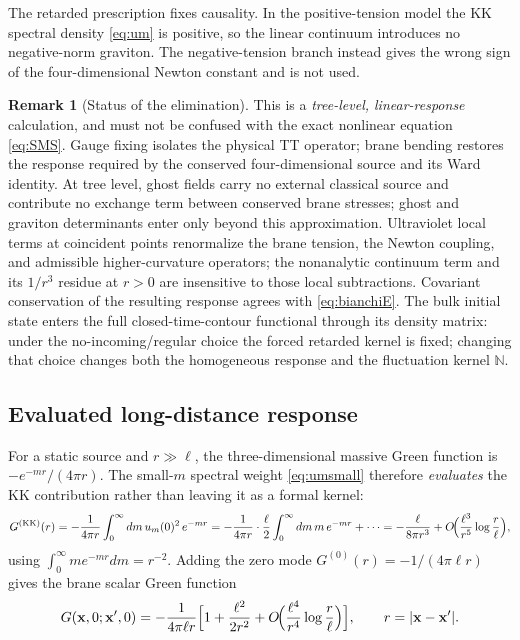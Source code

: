 \documentclass[11pt,a4paper]{article}
\theoremstyle{plain}
\theoremstyle{definition}
\newtheorem{remark}[theorem]{Remark}
\newcommand{\KK}{\mathrm{KK}}
\begin{document}
The retarded prescription fixes causality. In the positive-tension model
the KK spectral density \eqref{eq:um} is positive, so the linear
continuum introduces no negative-norm graviton. The negative-tension
branch instead gives the wrong sign of the four-dimensional Newton
constant and is not used.

\begin{remark}[Status of the elimination]
\label{rem:treelevel}
This is a \emph{tree-level, linear-response} calculation, and must not be
confused with the exact nonlinear equation \eqref{eq:SMS}. Gauge fixing
isolates the physical TT operator; brane bending restores the response
required by the conserved four-dimensional source and its Ward identity.
At tree level, ghost fields carry no external classical source and
contribute no exchange term between conserved brane stresses; ghost and
graviton determinants enter only beyond this approximation. Ultraviolet
local terms at coincident points renormalize the brane tension, the
Newton coupling, and admissible higher-curvature operators; the
nonanalytic continuum term and its $1/r^3$ residue at $r>0$ are
insensitive to those local subtractions. Covariant conservation of the
resulting response agrees with \eqref{eq:bianchiE}. The bulk initial
state enters the full closed-time-contour functional through its density
matrix: under the no-incoming/regular choice the forced retarded kernel
is fixed; changing that choice changes both the homogeneous response and
the fluctuation kernel $\mathbb N$.
\end{remark}

\subsection{Evaluated long-distance response}
\label{sec:longdistance}

For a static source and $r\gg\ell$, the three-dimensional massive Green
function is $-e^{-mr}/(4\pi r)$. The small-$m$ spectral weight
\eqref{eq:umsmall} therefore \emph{evaluates} the KK contribution rather
than leaving it as a formal kernel:
\begin{equation}
\label{eq:GKKr}
G^{(\KK)}(r)
=-\frac{1}{4\pi r}\int_0^\infty dm\,u_m(0)^2\,e^{-mr}
=-\frac{1}{4\pi r}\cdot\frac{\ell}{2}\int_0^\infty dm\,m\,e^{-mr}
+\cdots
=-\frac{\ell}{8\pi r^3}
+O\!\Bigl(\frac{\ell^3}{r^5}\log\frac r\ell\Bigr),
\end{equation}
using $\int_0^\infty m e^{-mr}dm=r^{-2}$. Adding the zero mode
$G^{(0)}(r)=-1/(4\pi\ell r)$ gives the brane scalar Green function
\begin{equation}
\label{eq:Gtotal}
G(\mathbf x,0;\mathbf x',0)
=-\frac{1}{4\pi\ell r}
\Bigl[1+\frac{\ell^2}{2r^2}
+O\!\Bigl(\frac{\ell^4}{r^4}\log\frac r\ell\Bigr)\Bigr],
\qquad r=|\mathbf x-\mathbf x'| .
\end{equation}
\end{document}
